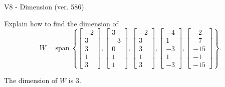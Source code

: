 \begin{exercise}
  \begin{exerciseTitle}V8 - Dimension (ver. 586)\end{exerciseTitle}
  \begin{exerciseStatement}
    Explain how to find the dimension of 
\[W=\mathrm{span}\ \left\{\left[\begin{array}{r}
-2 \\
3 \\
3 \\
1 \\
3
\end{array}\right] , \left[\begin{array}{r}
3 \\
-3 \\
0 \\
1 \\
1
\end{array}\right] , \left[\begin{array}{r}
-2 \\
3 \\
3 \\
1 \\
3
\end{array}\right] , \left[\begin{array}{r}
-4 \\
1 \\
-3 \\
1 \\
-3
\end{array}\right] , \left[\begin{array}{r}
-2 \\
-7 \\
-15 \\
-1 \\
-15
\end{array}\right]\right\}.\]



  \end{exerciseStatement}
  \begin{exerciseAnswer}
   The dimension of \(W\) is  \(3\).
  


  \end{exerciseAnswer}
\end{exercise}